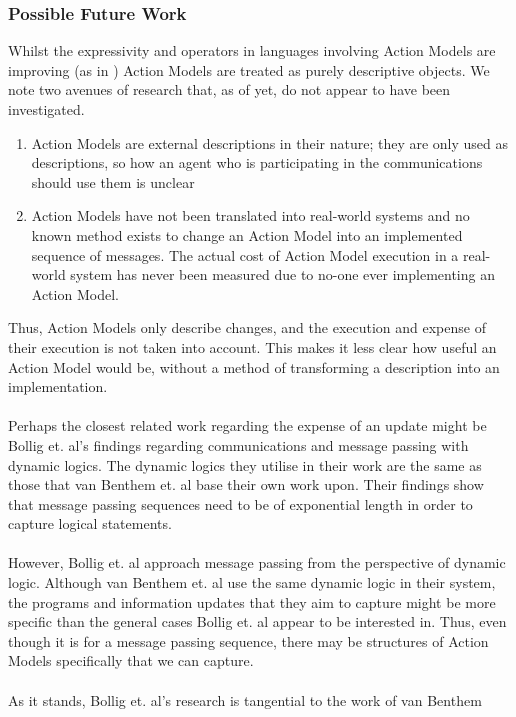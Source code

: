 \documentclass[12pt, a4paper, twoside]{article}
\begin{document}
\subsubsection{Possible Future Work}
Whilst the expressivity and operators in languages involving Action Models are
improving (as in \citep{benthem2006lcc}) Action Models are treated as purely
descriptive objects.
We note two avenues of research that, as of yet, do not appear to have been
investigated.
\begin{enumerate}
	\item Action Models are external descriptions in their nature; they are only used as
	descriptions, so how an agent who is participating in the communications
	should use them is unclear
	\item Action Models have not been translated into real-world systems and no
	known method exists to change an Action Model into an implemented sequence of
	messages. The actual cost of Action Model execution in a real-world system has
	never been measured due to no-one ever implementing an Action Model.
\end{enumerate}
Thus, Action Models only describe changes, and the execution and expense of
their execution is not taken into account.
This makes it less clear how useful an Action Model would be, without a method
of transforming a description into an implementation.\\
\\
Perhaps the closest related work regarding the expense of an update might be
Bollig et. al's findings regarding communications and message passing with
dynamic logics.
The dynamic logics they utilise in their work are the same as those that van
Benthem et. al base their own work upon.
Their findings show that message passing sequences need to be of exponential
length in order to capture logical statements. \citep{bollig07mps}\\
\\
However, Bollig et. al approach message passing from the perspective of dynamic
logic.
Although van Benthem et. al use the same dynamic logic in their system, the
programs and information updates that they aim to capture might be more specific
than the general cases Bollig et. al appear to be interested in.
Thus, even though it is for a message passing sequence, there may be
structures of Action Models specifically that we can capture.\\
\\
As it stands, Bollig et. al's research is tangential to the work of van Benthem
\end{document}
